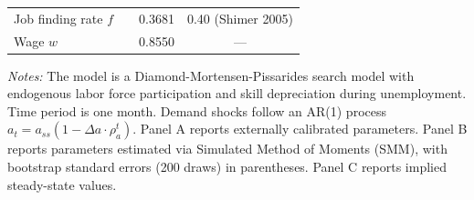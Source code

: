 \begin{table}[H]
\begin{threeparttable}
\begin{tabular}{llcc}
Job finding rate $f$ & & 0.3681 & 0.40 (Shimer 2005) \\
Wage $w$ & & 0.8550 & --- \\
\bottomrule
\end{tabular}
\begin{tablenotes}[flushleft]
\small
\item \textit{Notes:} The model is a Diamond-Mortensen-Pissarides search model with endogenous labor force participation and skill depreciation during unemployment. Time period is one month. Demand shocks follow an AR(1) process $a_t = a_{ss}(1 - \Delta a \cdot \rho_a^t)$. Panel A reports externally calibrated parameters. Panel B reports parameters estimated via Simulated Method of Moments (SMM), with bootstrap standard errors (200 draws) in parentheses. Panel C reports implied steady-state values.
\end{tablenotes}
\end{threeparttable}
\label{tab:calibration}
\end{table}
